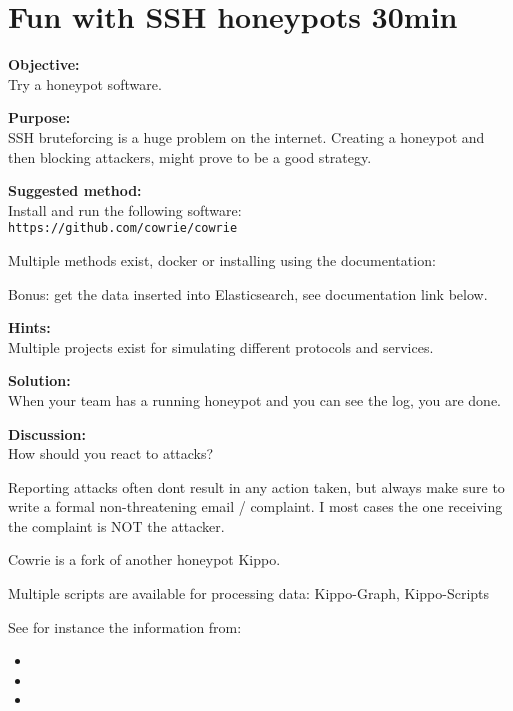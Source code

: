 \documentclass[a4paper,11pt,notitlepage]{report}
\begin{document}
\chapter{Fun with SSH honeypots 30min}
\label{ex:ssh-honeypot}

{\bf Objective:}\\
Try a honeypot software.

{\bf Purpose:}\\
SSH bruteforcing is a huge problem on the internet. Creating a honeypot and then blocking attackers, might prove to be a good strategy.

{\bf Suggested method:}\\
Install and run the following software:\\
\verb+https://github.com/cowrie/cowrie+

Multiple methods exist, docker or installing using the documentation:\\

Bonus: get the data inserted into Elasticsearch, see documentation link below.

{\bf Hints:}\\
Multiple projects exist for simulating different protocols and services.

{\bf Solution:}\\
When your team has a running honeypot and you can see the log, you are done.

{\bf Discussion:}\\
How should you react to attacks?

Reporting attacks often dont result in any action taken, but always make sure to write a formal non-threatening email / complaint. I most cases the one receiving the complaint is NOT the attacker.

Cowrie is a fork of another honeypot Kippo.

Multiple scripts are available for processing data: Kippo-Graph, Kippo-Scripts

See for instance the information from:
\begin{itemize}
\item {}
\item {}
\item {}
\end{itemize}
\end{document}
